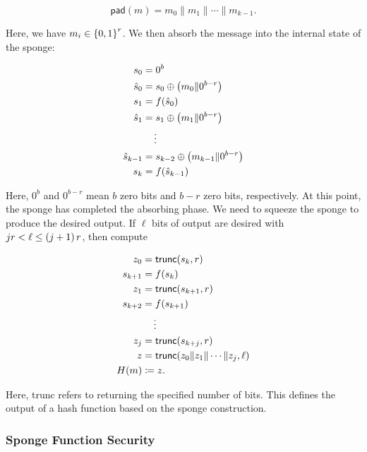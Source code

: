 \begin{equation}
    \textsf{pad}(m) = m_{0}\|m_{1}\|\cdots\|m_{k-1}.
\end{equation}

\noindent
Here, we have $m_{i}\in\left\{ 0,1 \right\}^{r}$.
We then absorb the message into the internal state of the sponge:

\begin{align}
    s_{0} &= 0^{b}
        \nonumber\\
    \hat{s}_{0} &= s_{0} \oplus \left( m_{0}\|0^{b-r} \right)
        \nonumber\\
    s_{1} &= f(\hat{s}_{0})
        \nonumber\\
    \hat{s}_{1} &= s_{1} \oplus \left( m_{1}\|0^{b-r} \right)
        \nonumber\\
    &\quad \vdots
        \nonumber\\
    \hat{s}_{k-1} &= s_{k-2} \oplus \left( m_{k-1}\|0^{b-r} \right)
        \nonumber\\
    s_{k} &= f(\hat{s}_{k-1})
\end{align}

\noindent
Here, $0^{b}$ and $0^{b-r}$ mean $b$ zero bits and $b-r$ zero bits,
respectively.
At this point, the sponge has completed the absorbing phase.
We need to squeeze the sponge to produce the desired output.
If $\ell$ bits of output are desired with $jr < \ell \le \left( j+1 \right)r$,
then compute

\begin{align}
    z_{0} &= \textsf{trunc}(s_{k}, r)
        \nonumber\\
    s_{k+1} &= f(s_{k})
        \nonumber\\
    z_{1} &= \textsf{trunc}(s_{k+1}, r)
        \nonumber\\
    s_{k+2} &= f(s_{k+1})
        \nonumber\\
    &\quad \vdots
        \nonumber\\
    z_{j} &= \textsf{trunc}(s_{k+j}, r)
        \nonumber\\
    z &= \textsf{trunc}(z_{0}\|z_{1}\|\cdots\|z_{j}, \ell)
        \nonumber\\
    H(m) &\coloneqq{} z.
\end{align}

\noindent
Here, \textsf{trunc} refers to returning the
specified number of bits.
This defines the output of a \gls{hash function} based
on the sponge construction.

\subsubsection{Sponge Function Security}

